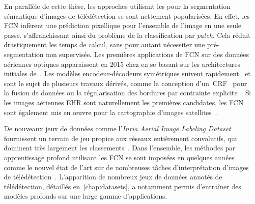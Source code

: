 En parallèle de cette thèse, les approches utilisant les  pour la segmentation sémantique d'images de télédétection se sont nettement popularisées. En effet, les \gls{FCN} infèrent une prédiction pixellique pour l'ensemble de l'image en une seule passe, s'affranchissant ainsi du problème de la classification par \emph{patch}. Cela réduit drastiquement les temps de calcul, sans pour autant nécessiter une pré-segmentation non supervisée. Les premières applications de \gls{FCN} sur des données aériennes optiques apparaissent en 2015 chez \citet{paisitkriangkrai_effective_2015,sherrah_fully_2016} en se basant sur les architectures initiales de~\citet{long_fully_2015}. Les modèles encodeur-décodeurs symétriques suivent rapidement~\cite{volpi_dense_2017,audebert_semantic_2016} et sont le sujet de plusieurs travaux dérivés, comme la conception d'un~\gls{CRF}~\cite{liu_dense_2017} pour la fusion de données ou la régularisation des bordures par contrainte explicite~\cite{marmanis_classification_2017}. Si les images aériennes \gls{EHR} sont naturellement les premières candidates, les \gls{FCN} sont également mis en \oe{}uvre pour la cartographie d'images satellites~\cite{fu_classification_2017}.

De nouveaux jeux de données comme l'\emph{Inria Aerial Image Labeling Dataset} fournissent un terrain de jeu propice aux réseaux entièrement convolutifs, qui dominent très largement les classements~\cite{huang_large-scale_2018}. Dans l'ensemble, les méthodes par apprentissage profond utilisant les \gls{FCN} se sont imposées en quelques années comme le nouvel état de l'art sur de nombreuses tâches d'interprétation d'images de télédétection~\cite{liu_comparing_2018}. L'apparition de nombreux jeux de données annotés de télédétection, détaillés en~\cref{chap:datasets}, a notamment permis d'entraîner des modèles profonds sur une large gamme d'applications.

%
%
\printbibliography
